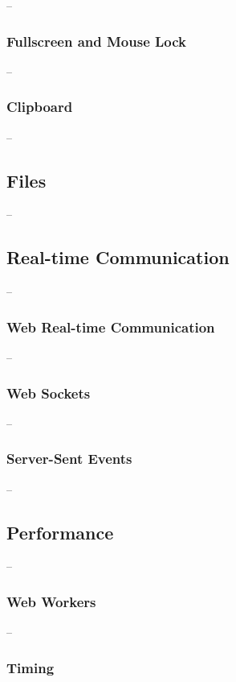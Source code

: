 --

\subsubsection{Fullscreen and Mouse Lock}

--

\subsubsection{Clipboard}

--

\subsection{Files}

--

\subsection{Real-time Communication}

--

\subsubsection{Web Real-time Communication}

--

\subsubsection{Web Sockets}

--

\subsubsection{Server-Sent Events}

--

\subsection{Performance}

--

\subsubsection{Web Workers}

--

\subsubsection{Timing}


